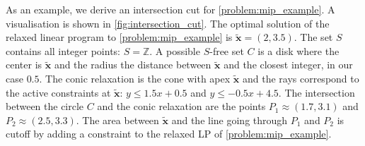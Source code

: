 As an example, we derive an intersection cut for \cref{problem:mip_example}. A visualisation is shown in \cref{fig:intersection_cut}. 
The optimal solution of the relaxed linear program to \cref{problem:mip_example} is $\boldsymbol{\tilde x} = (2, 3.5)$. The set $S$ contains all integer points: $S = \mathbb{Z}$. A possible $S$-free set $C$ is a disk where the center is $\boldsymbol{\tilde x}$ and the radius the distance between $\boldsymbol{\tilde x}$ and the closest integer, in our case $0.5$. 
The conic relaxation is the cone with apex $\boldsymbol{\tilde x}$ and the rays correspond to the active constraints at $\boldsymbol{\tilde x}$: $y \leq 1.5x + 0.5$ and $y \leq -0.5 x + 4.5$. 
The intersection between the circle $C$ and the conic relaxation are the points $P_1 \approx (1.7,3.1)$ and $P_2 \approx (2.5,3.3)$. The area between $\boldsymbol{\tilde x}$ and the line going through $P_1$ and $P_2$ is cutoff by adding a constraint to the relaxed LP of \cref{problem:mip_example}. 

